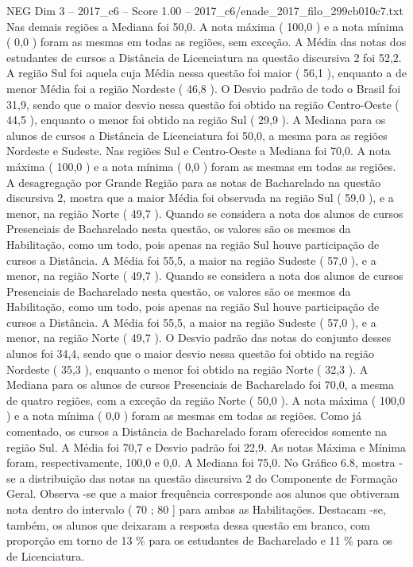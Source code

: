 \begin{textsample}{NEG Dim 3 – 2017\_c6 – Score 1.00 – 2017\_c6/enade\_2017\_filo\_299cb010c7.txt}
Nas demais regiões a Mediana foi 50,0.
A nota máxima ( 100,0 ) e a nota mínima ( 0,0 ) foram as mesmas em todas as regiões, sem exceção.
A Média das notas dos estudantes de cursos a Distância de Licenciatura na questão discursiva 2 foi 52,2.
A região Sul foi aquela cuja Média nessa questão foi maior ( 56,1 ), enquanto a de menor Média foi a região Nordeste ( 46,8 ).
O Desvio padrão de todo o Brasil foi 31,9, sendo que o maior desvio nessa questão foi obtido na região Centro-Oeste ( 44,5 ), enquanto o menor foi obtido na região Sul ( 29,9 ).
A Mediana para os alunos de cursos a Distância de Licenciatura foi 50,0, a mesma para as regiões Nordeste e Sudeste.
Nas regiões Sul e Centro-Oeste a Mediana foi 70,0.
A nota máxima ( 100,0 ) e a nota mínima ( 0,0 ) foram as mesmas em todas as regiões.
A desagregação por Grande Região para as notas de Bacharelado na questão discursiva 2, mostra que a maior Média foi observada na região Sul ( 59,0 ), e a menor, na região Norte ( 49,7 ).
Quando se considera a nota dos alunos de cursos Presenciais de Bacharelado nesta questão, os valores são os mesmos da Habilitação, como um todo, pois apenas na região Sul houve participação de cursos a Distância.
A Média foi 55,5, a maior na região Sudeste ( 57,0 ), e a menor, na região Norte ( 49,7 ).
Quando se considera a nota dos alunos de cursos Presenciais de Bacharelado nesta questão, os valores são os mesmos da Habilitação, como um todo, pois apenas na região Sul houve participação de cursos a Distância.
A Média foi 55,5, a maior na região Sudeste ( 57,0 ), e a menor, na região Norte ( 49,7 ).
O Desvio padrão das notas do conjunto desses alunos foi 34,4, sendo que o maior desvio nessa questão foi obtido na região Nordeste ( 35,3 ), enquanto o menor foi obtido na região Norte ( 32,3 ).
A Mediana para os alunos de cursos Presenciais de Bacharelado foi 70,0, a mesma de quatro regiões, com a exceção da região Norte ( 50,0 ).
A nota máxima ( 100,0 ) e a nota mínima ( 0,0 ) foram as mesmas em todas as regiões.
Como já comentado, os cursos a Distância de Bacharelado foram oferecidos somente na região Sul.
A Média foi 70,7 e Desvio padrão foi 22,9.
As notas Máxima e Mínima foram, respectivamente, 100,0 e 0,0.
A Mediana foi 75,0.
No Gráfico 6.8, mostra -se a distribuição das notas na questão discursiva 2 do Componente de Formação Geral.
Observa -se que a maior frequência corresponde aos alunos que obtiveram nota dentro do intervalo ( 70 ; 80 ] para ambas as Habilitações.
Destacam -se, também, os alunos que deixaram a resposta dessa questão em branco, com proporção em torno de 13 \% para os estudantes de Bacharelado e 11 \% para os de Licenciatura.

\end{textsample}

